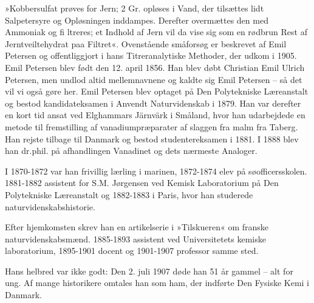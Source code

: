 %





»Kobbersulfat prøves for Jern; 2 Gr. opløses i Vand, der tilsættes lidt Salpetersyre og Opløsningen inddampes. Derefter overmættes den med Ammoniak og fi ltreres; et Indhold af Jern vil
da vise sig som en rødbrun Rest af Jerntveiltehydrat paa Filtret«.
Ovenstående småforsøg er beskrevet af Emil Petersen og offentliggjort i hans Titreranalytiske Methoder, der udkom i 1905.
Emil Petersen blev født den 12. april 1856. Han blev døbt
Christian Emil Ulrich Petersen, men undlod altid mellemnavnene og kaldte sig Emil Petersen – så det vil vi også gøre her.
Emil Petersen blev optaget på Den Polytekniske Læreanstalt
og bestod kandidateksamen i Anvendt Naturvidenskab i 1879.
Han var derefter en kort tid ansat ved Elghammars Järnvärk i
Småland, hvor han udarbejdede en metode til fremstilling af
vanadiumpræparater af slaggen fra malm fra Taberg. Han rejste
tilbage til Danmark og bestod studentereksamen i 1881. I 1888
blev han dr.phil. på afhandlingen Vanadinet og dets nærmeste
Analoger.

I 1870-1872 var han frivillig lærling i marinen, 1872-1874
elev på søofficersskolen. 1881-1882 assistent for S.M. Jørgensen
ved Kemisk Laboratorium på Den Polytekniske Læreanstalt og
1882-1883 i Paris, hvor han studerede naturvidenskabshistorie.

Efter hjemkomsten skrev han en artikelserie i »Tilskueren« om
franske naturvidenskabsmænd. 1885-1893 assistent ved Universitetets kemiske laboratorium, 1895-1901 docent og 1901-1907
professor samme sted.

Hans helbred var ikke godt: Den 2. juli 1907 døde han 51 år
gammel – alt for ung. Af mange historikere omtales han som
ham, der indførte Den Fysiske Kemi i Danmark.
